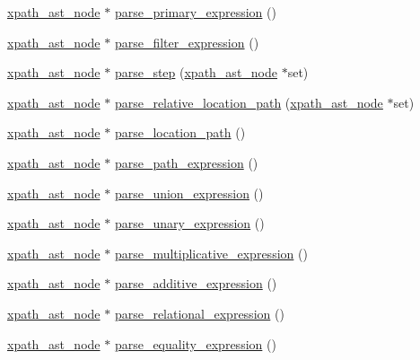 \begin{DoxyCompactItemize}
\item 
\hyperlink{classxpath__ast__node}{xpath\-\_\-ast\-\_\-node} $\ast$ \hyperlink{structxpath__parser_a320728b83e426c4874066d633ffe65d9}{parse\-\_\-primary\-\_\-expression} ()
\item 
\hyperlink{classxpath__ast__node}{xpath\-\_\-ast\-\_\-node} $\ast$ \hyperlink{structxpath__parser_a0530aefc1445c4eac4614e895dd0a219}{parse\-\_\-filter\-\_\-expression} ()
\item 
\hyperlink{classxpath__ast__node}{xpath\-\_\-ast\-\_\-node} $\ast$ \hyperlink{structxpath__parser_a7daf146822e199d8ad564be25daa49db}{parse\-\_\-step} (\hyperlink{classxpath__ast__node}{xpath\-\_\-ast\-\_\-node} $\ast$set)
\item 
\hyperlink{classxpath__ast__node}{xpath\-\_\-ast\-\_\-node} $\ast$ \hyperlink{structxpath__parser_ab50d8b75f78b7e2eb77a1cf6872daa00}{parse\-\_\-relative\-\_\-location\-\_\-path} (\hyperlink{classxpath__ast__node}{xpath\-\_\-ast\-\_\-node} $\ast$set)
\item 
\hyperlink{classxpath__ast__node}{xpath\-\_\-ast\-\_\-node} $\ast$ \hyperlink{structxpath__parser_aae61a2931ba0b0c713b5d043f1cef6d4}{parse\-\_\-location\-\_\-path} ()
\item 
\hyperlink{classxpath__ast__node}{xpath\-\_\-ast\-\_\-node} $\ast$ \hyperlink{structxpath__parser_a024b539aa4ea7226edce0a3d0a577549}{parse\-\_\-path\-\_\-expression} ()
\item 
\hyperlink{classxpath__ast__node}{xpath\-\_\-ast\-\_\-node} $\ast$ \hyperlink{structxpath__parser_a2b5326e67d26a880cf29343a61e23891}{parse\-\_\-union\-\_\-expression} ()
\item 
\hyperlink{classxpath__ast__node}{xpath\-\_\-ast\-\_\-node} $\ast$ \hyperlink{structxpath__parser_af5f2714594608f2536f3324c27ce7969}{parse\-\_\-unary\-\_\-expression} ()
\item 
\hyperlink{classxpath__ast__node}{xpath\-\_\-ast\-\_\-node} $\ast$ \hyperlink{structxpath__parser_a384f3f30c6182714b02df188314abb95}{parse\-\_\-multiplicative\-\_\-expression} ()
\item 
\hyperlink{classxpath__ast__node}{xpath\-\_\-ast\-\_\-node} $\ast$ \hyperlink{structxpath__parser_a7744f7e05f69fa9c073d7a241036ee08}{parse\-\_\-additive\-\_\-expression} ()
\item 
\hyperlink{classxpath__ast__node}{xpath\-\_\-ast\-\_\-node} $\ast$ \hyperlink{structxpath__parser_a2a3164bf53415c43fbe0b5293d8c9efe}{parse\-\_\-relational\-\_\-expression} ()
\item 
\hyperlink{classxpath__ast__node}{xpath\-\_\-ast\-\_\-node} $\ast$ \hyperlink{structxpath__parser_aa63ac82f43eaa1c9f8769174adc87f48}{parse\-\_\-equality\-\_\-expression} ()

\end{DoxyCompactItemize}
